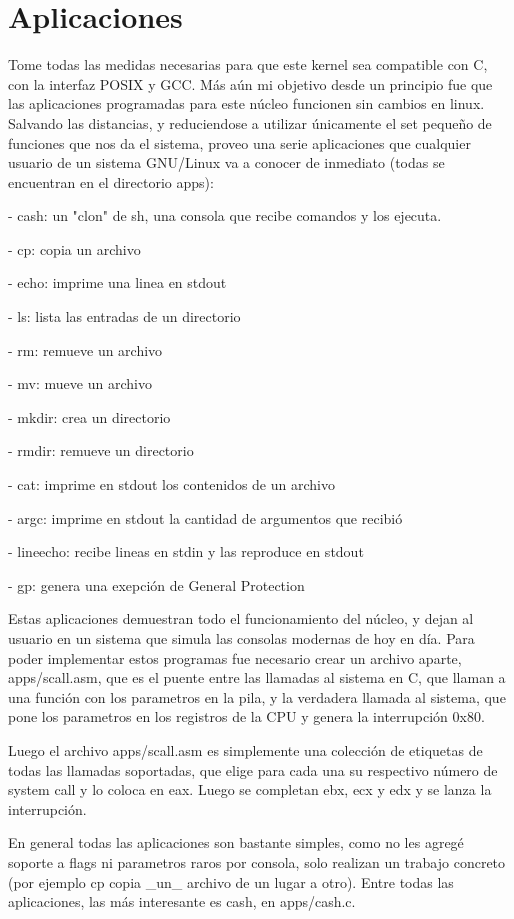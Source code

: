 \section{Aplicaciones}

Tome todas las medidas necesarias para que este kernel sea compatible con C,
con la interfaz POSIX y GCC. Más aún mi objetivo desde un principio fue que las
aplicaciones programadas para este núcleo funcionen sin cambios en linux.
Salvando las distancias, y reduciendose a utilizar únicamente el set pequeño
de funciones que nos da el sistema, proveo una serie aplicaciones que cualquier
usuario de un sistema GNU/Linux va a conocer de inmediato (todas se encuentran
en el directorio apps):

- cash: un "clon" de sh, una consola que recibe comandos y los ejecuta.

- cp: copia un archivo

- echo: imprime una linea en stdout

- ls: lista las entradas de un directorio

- rm: remueve un archivo

- mv: mueve un archivo

- mkdir: crea un directorio

- rmdir: remueve un directorio

- cat: imprime en stdout los contenidos de un archivo

- argc: imprime en stdout la cantidad de argumentos que recibió

- lineecho: recibe lineas en stdin y las reproduce en stdout

- gp: genera una exepción de General Protection

Estas aplicaciones demuestran todo el funcionamiento del núcleo, y dejan al
usuario en un sistema que simula las consolas modernas de hoy en día. Para
poder implementar estos programas fue necesario crear un archivo aparte,
apps/scall.asm, que es el puente entre las llamadas al sistema en C, que llaman
a una función con los parametros en la pila, y la verdadera llamada al sistema,
que pone los parametros en los registros de la CPU y genera la interrupción
0x80.

Luego el archivo apps/scall.asm es simplemente una colección de etiquetas de
todas las llamadas soportadas, que elige para cada una su respectivo número de
system call y lo coloca en eax. Luego se completan ebx, ecx y edx y se lanza la
interrupción.

En general todas las aplicaciones son bastante simples, como no les agregé
soporte a flags ni parametros raros por consola, solo realizan un trabajo
concreto (por ejemplo cp copia \_un\_ archivo de un lugar a otro). Entre todas
las aplicaciones, las más interesante es cash, en apps/cash.c.

